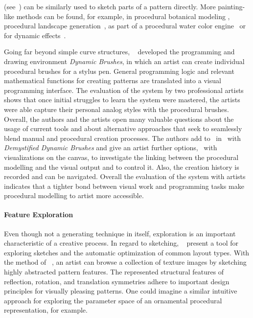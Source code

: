 \cite{gieseke_2017_ooo, kazi_2012_vit, xing_2014_apr, xing_2015_aha} (see~) can be similarly used to sketch parts of a pattern directly. More painting-like methods can be found, for example, in procedural botanical modeling \cite{anastacio_2008_spl,chen_2008_stm,palubicki_2009_sot}, procedural landscape generation~\cite{emilien_2015_wie}, as part of a procedural water color engine~\cite{diverdi_2013_ppp} or for dynamic effects~\cite{xing_2016_eit}. 


Going far beyond simple curve structures, \citeauthor*{jacobs_2018_dbe}~\cite{jacobs_2018_dbe} developed the programming and drawing environment \textit{Dynamic Brushes}, in which an artist can create individual procedural brushes for a stylus pen. General programming logic and relevant mathematical functions for creating patterns are translated into a visual programming interface. The evaluation of the system by two professional artists shows that once initial struggles to learn the system were mastered, the artists were able capture their personal analog styles with the procedural brushes. Overall, the authors and the artists open many valuable questions about the usage of current tools and about alternative approaches that seek to seamlessly blend manual and procedural creation processes. The authors add to~\cite{jacobs_2018_dbe} in~\cite{li_2020_sva} with \textit{Demystified Dynamic Brushes} and give an artist further options, \eg~with visualizations on the canvas, to investigate the linking between the procedural modelling and the visual output and to control it. Also, the creation history is recorded and can be navigated. Overall the evaluation of the system with artists indicates that a tighter bond between visual work and programming tasks make procedural modelling to artist more accessible.

\paragraph*{Feature Exploration}
\label{para:analysis_rulebased_exploration}

Even though not a generating technique in itself, exploration is an important characteristic of a creative process. In regard to sketching, \citeauthor*{todi_2016_sse}~\cite{todi_2016_sse} present a tool for exploring sketches and the automatic optimization of common layout types. With the method of \citeauthor*{chen_2016_msi}~\cite{chen_2016_msi}, an artist can browse a collection of texture images by sketching highly abstracted pattern features. The represented structural features of reflection, rotation, and translation symmetries adhere to important design principles for visually pleasing patterns. One could imagine a similar intuitive approach for exploring the parameter space of an ornamental procedural representation, for example.

